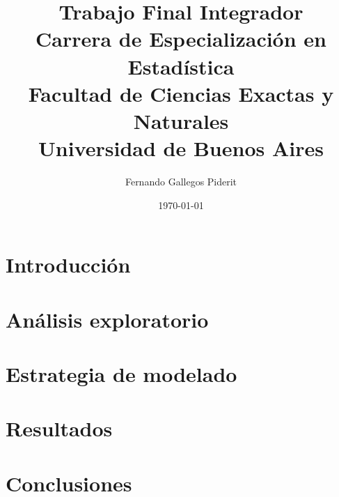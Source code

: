\documentclass[a4paper, titlepage]{article}
\title{Trabajo Final Integrador \\[1em]%
  \large Carrera de Especialización en Estadística \\%
  Facultad de Ciencias Exactas y Naturales \\%
  Universidad de Buenos Aires}
\author{Fernando Gallegos Piderit}
\date{\today}
\begin{document}

\maketitle

\tableofcontents

\section{Introducción}




\section{Análisis exploratorio}\label{sec:aed}




\section{Estrategia de modelado}\label{sec:estmod}



\section{Resultados}\label{sec:res}



\section{Conclusiones}\label{sec:con}


\end{document}
